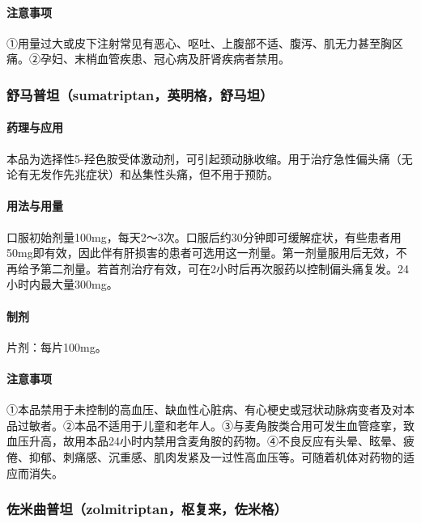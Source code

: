 \paragraph{注意事项}

①用量过大或皮下注射常见有恶心、呕吐、上腹部不适、腹泻、肌无力甚至胸区痛。②孕妇、末梢血管疾患、冠心病及肝肾疾病者禁用。

\subsubsection{舒马普坦（sumatriptan，英明格，舒马坦）}

\paragraph{药理与应用}

本品为选择性5-羟色胺受体激动剂，可引起颈动脉收缩。用于治疗急性偏头痛（无论有无发作先兆症状）和丛集性头痛，但不用于预防。

\paragraph{用法与用量}

口服初始剂量100mg，每天2～3次。口服后约30分钟即可缓解症状，有些患者用50mg即有效，因此伴有肝损害的患者可选用这一剂量。第一剂量服用后无效，不再给予第二剂量。若首剂治疗有效，可在2小时后再次服药以控制偏头痛复发。24小时内最大量300mg。

\paragraph{制剂}

片剂：每片100mg。

\paragraph{注意事项}

①本品禁用于未控制的高血压、缺血性心脏病、有心梗史或冠状动脉病变者及对本品过敏者。②本品不适用于儿童和老年人。③与麦角胺类合用可发生血管痉挛，致血压升高，故用本品24小时内禁用含麦角胺的药物。④不良反应有头晕、眩晕、疲倦、抑郁、刺痛感、沉重感、肌肉发紧及一过性高血压等。可随着机体对药物的适应而消失。

\subsubsection{佐米曲普坦（zolmitriptan，枢复来，佐米格）}

